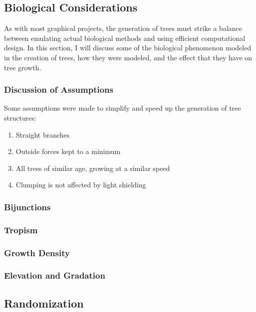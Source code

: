 \documentclass{article}
\newcommand{\tab}{\hspace*{2em}}
\begin{document}
        \subsection{Biological Considerations}
    \tab As with most graphical projects, the generation of trees must strike a balance between
emulating actual biological methods and using efficient computational design. In this section, I
will discuss some of the biological phenomenon modeled in the creation of trees, how they were
modeled, and the effect that they have on tree growth. 

            \subsubsection{Discussion of Assumptions}
    \tab Some assumptions were made to simplify and speed up the generation of tree structures:
\begin{enumerate}
    \item Straight branches
    \item Outside forces kept to a minimum
    \item All trees of similar age, growing at a similar speed
    \item Clumping is not affected by light shielding
\end{enumerate}

            \subsubsection{Bijunctions} %

            \subsubsection{Tropism}
            \subsubsection{Growth Density}
            \subsubsection{Elevation and Gradation}

        \subsection{Randomization}
\end{document}
